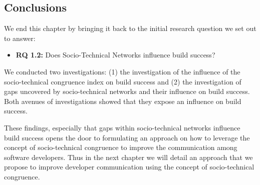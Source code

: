 %



\subsection{Conclusions}
\label{sec:conclusion}
We end this chapter by bringing it back to the initial research question we set out to answer:
\begin{itemize}
  \item\textbf{RQ 1.2:} Does Socio-Technical Networks influence build success?
\end{itemize}

We conducted two investigations: (1) the investigation of the influence of the socio-technical congruence index on build success and (2) the investigation of gaps uncovered by socio-technical networks and their influence on build success.
Both avenues of investigations showed that they expose an influence on build success.

These findings, especially that gaps within socio-technical networks influence build success opens the door to formulating an approach on how to leverage the concept of socio-technical congruence to improve the communication among software developers.
Thus in the next chapter we will detail an approach that we propose to improve developer communication using the concept of socio-technical congruence.
